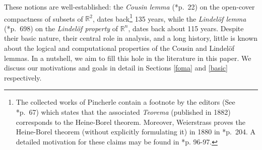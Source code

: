 \documentclass[reqno]{amsart}
\newcommand{\Z}{{\textsf{\textup{Z}}}}
\def\R{{\mathbb  R}}
\numberwithin{equation}{section}
\numberwithin{thm}{section}
\begin{document}
These notions are well-established: the \emph{Cousin lemma} (\cite{cousin1}*{p.\ 22}) on the open-cover compactness of subsets of $\R^{2}$, 
dates back\footnote{The collected works of Pincherle contain a footnote by the editors (See \cite{tepelpinch}*{p.\ 67}) which states that the associated \emph{Teorema} (published in 1882) corresponds to the Heine-Borel theorem.  Moreover, Weierstrass proves the Heine-Borel theorem (without explicitly formulating it) in 1880 in \cite{amaimennewekker}*{p.\ 204}.   A detailed motivation for these claims may be found in \cite{medvet}*{p. 96-97}.} 135 years, while the \emph{Lindel\"of lemma} (\cite{blindeloef}*{p.\ 698}) on the \emph{Lindel\"of property} of $\R^{n}$, dates back about 115 years.  
Despite their basic nature, their central role in analysis, and a long history, little is known about the logical and computational properties of the Cousin and Lindel\"of lemmas.  In a nutshell, we aim to fill this hole in the literature in this paper.  We discuss our motivations and goals in detail in Sections \ref{foma} and \ref{basic} respectively.   
%
%
%
\end{document}
